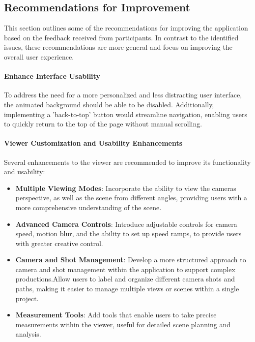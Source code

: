 
\subsection*{Recommendations for Improvement}
\label{sec:results:recommendations}

This section outlines some of the recommendations for improving the application based on the feedback received from participants. 
In contrast to the identified issues, these recommendations are more general and focus on improving the overall user experience.

\paragraph{Enhance Interface Usability}
To address the need for a more personalized and less distracting user interface, the animated background should be able to be disabled.
Additionally, implementing a 'back-to-top' button would streamline navigation, enabling users to quickly return to the top of the page without manual scrolling. 
\cite{P10}

\paragraph{Viewer Customization and Usability Enhancements}
Several enhancements to the viewer are recommended to improve its functionality and usability:

\begin{itemize}
  \item \textbf{Multiple Viewing Modes}: Incorporate the ability to view the cameras perspective, as well as the scene from different angles, providing users with a more comprehensive understanding of the scene. 
  \cite{P5}
  \item \textbf{Advanced Camera Controls}: Introduce adjustable controls for camera speed, motion blur, and the ability to set up speed ramps, to provide users with greater creative control. 
  \cite{P5}
  \item \textbf{Camera and Shot Management}: Develop a more structured approach to camera and shot management within the application to support complex productions.Allow users to label and organize different camera shots and paths, making it easier to manage multiple views or scenes within a single project.
  \cite{P5}
  \item \textbf{Measurement Tools}: Add tools that enable users to take precise measurements within the viewer, useful for detailed scene planning and analysis. 
  \cite{P7}
\end{itemize}

